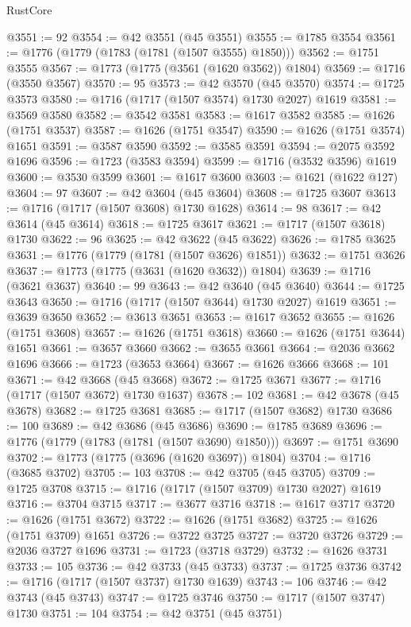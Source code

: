 \begin{lexlean}{RustCore}
\begin{coremodule}
@3551 := 92
@3554 := @42 @3551 (@45 @3551)
@3555 := @1785 @3554
@3561 := @1776 (@1779 (@1783 (@1781 (@1507 @3555) @1850)))
@3562 := @1751 @3555
@3567 := @1773 (@1775 (@3561 (@1620 @3562)) @1804)
@3569 := @1716 (@3550 @3567)
@3570 := 95
@3573 := @42 @3570 (@45 @3570)
@3574 := @1725 @3573
@3580 := @1716 (@1717 (@1507 @3574) @1730 @2027) @1619
@3581 := @3569 @3580
@3582 := @3542 @3581
@3583 := @1617 @3582
@3585 := @1626 (@1751 @3537)
@3587 := @1626 (@1751 @3547)
@3590 := @1626 (@1751 @3574) @1651
@3591 := @3587 @3590
@3592 := @3585 @3591
@3594 := @2075 @3592 @1696
@3596 := @1723 (@3583 @3594)
@3599 := @1716 (@3532 @3596) @1619
@3600 := @3530 @3599
@3601 := @1617 @3600
@3603 := @1621 (@1622 @127)
@3604 := 97
@3607 := @42 @3604 (@45 @3604)
@3608 := @1725 @3607
@3613 := @1716 (@1717 (@1507 @3608) @1730 @1628)
@3614 := 98
@3617 := @42 @3614 (@45 @3614)
@3618 := @1725 @3617
@3621 := @1717 (@1507 @3618) @1730
@3622 := 96
@3625 := @42 @3622 (@45 @3622)
@3626 := @1785 @3625
@3631 := @1776 (@1779 (@1781 (@1507 @3626) @1851))
@3632 := @1751 @3626
@3637 := @1773 (@1775 (@3631 (@1620 @3632)) @1804)
@3639 := @1716 (@3621 @3637)
@3640 := 99
@3643 := @42 @3640 (@45 @3640)
@3644 := @1725 @3643
@3650 := @1716 (@1717 (@1507 @3644) @1730 @2027) @1619
@3651 := @3639 @3650
@3652 := @3613 @3651
@3653 := @1617 @3652
@3655 := @1626 (@1751 @3608)
@3657 := @1626 (@1751 @3618)
@3660 := @1626 (@1751 @3644) @1651
@3661 := @3657 @3660
@3662 := @3655 @3661
@3664 := @2036 @3662 @1696
@3666 := @1723 (@3653 @3664)
@3667 := @1626 @3666
@3668 := 101
@3671 := @42 @3668 (@45 @3668)
@3672 := @1725 @3671
@3677 := @1716 (@1717 (@1507 @3672) @1730 @1637)
@3678 := 102
@3681 := @42 @3678 (@45 @3678)
@3682 := @1725 @3681
@3685 := @1717 (@1507 @3682) @1730
@3686 := 100
@3689 := @42 @3686 (@45 @3686)
@3690 := @1785 @3689
@3696 := @1776 (@1779 (@1783 (@1781 (@1507 @3690) @1850)))
@3697 := @1751 @3690
@3702 := @1773 (@1775 (@3696 (@1620 @3697)) @1804)
@3704 := @1716 (@3685 @3702)
@3705 := 103
@3708 := @42 @3705 (@45 @3705)
@3709 := @1725 @3708
@3715 := @1716 (@1717 (@1507 @3709) @1730 @2027) @1619
@3716 := @3704 @3715
@3717 := @3677 @3716
@3718 := @1617 @3717
@3720 := @1626 (@1751 @3672)
@3722 := @1626 (@1751 @3682)
@3725 := @1626 (@1751 @3709) @1651
@3726 := @3722 @3725
@3727 := @3720 @3726
@3729 := @2036 @3727 @1696
@3731 := @1723 (@3718 @3729)
@3732 := @1626 @3731
@3733 := 105
@3736 := @42 @3733 (@45 @3733)
@3737 := @1725 @3736
@3742 := @1716 (@1717 (@1507 @3737) @1730 @1639)
@3743 := 106
@3746 := @42 @3743 (@45 @3743)
@3747 := @1725 @3746
@3750 := @1717 (@1507 @3747) @1730
@3751 := 104
@3754 := @42 @3751 (@45 @3751)

\end{coremodule}
\end{lexlean}
